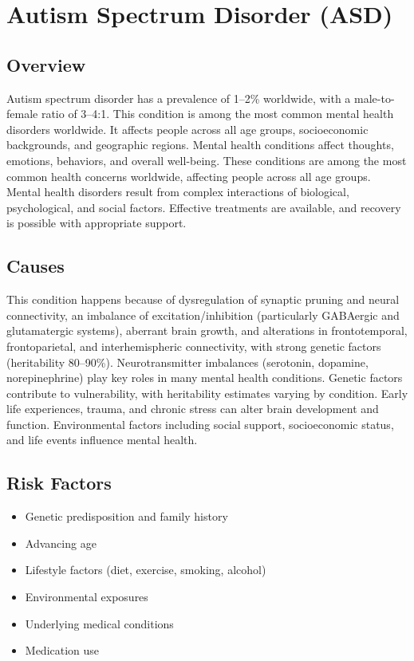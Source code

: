 \chapter{Autism Spectrum Disorder (ASD)}
\label{sec:Autism Spectrum Disorder (ASD)}

\section{Overview}
Autism spectrum disorder has a prevalence of 1--2\% worldwide, with a male-to-female ratio of 3--4:1. This condition is among the most common mental health disorders worldwide. It affects people across all age groups, socioeconomic backgrounds, and geographic regions. Mental health conditions affect thoughts, emotions, behaviors, and overall well-being. These conditions are among the most common health concerns worldwide, affecting people across all age groups. Mental health disorders result from complex interactions of biological, psychological, and social factors. Effective treatments are available, and recovery is possible with appropriate support.
\section{Causes}
This condition happens because of dysregulation of synaptic pruning and neural connectivity, an imbalance of excitation/inhibition (particularly GABAergic and glutamatergic systems), aberrant brain growth, and alterations in frontotemporal, frontoparietal, and interhemispheric connectivity, with strong genetic factors (heritability 80--90\%).  Neurotransmitter imbalances (serotonin, dopamine, norepinephrine) play key roles in many mental health conditions. Genetic factors contribute to vulnerability, with heritability estimates varying by condition. Early life experiences, trauma, and chronic stress can alter brain development and function. Environmental factors including social support, socioeconomic status, and life events influence mental health.   
\section{Risk Factors}
\begin{itemize}[noitemsep]
  \item Genetic predisposition and family history
  \item Advancing age
  \item Lifestyle factors (diet, exercise, smoking, alcohol)
  \item Environmental exposures
  \item Underlying medical conditions
  \item Medication use
\end{itemize}
